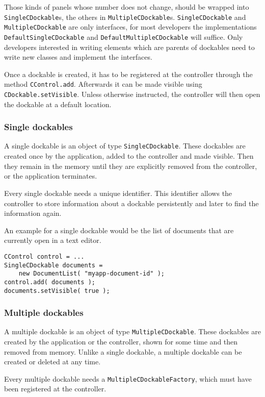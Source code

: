 \documentclass[a4paper,10pt]{article}
\newcommand{\src}[1]{\lstinline[basicstyle=\ttfamily]|#1|}
\begin{document}
Those kinds of panels whose number does not change, should be wrapped into \src{SingleCDockable}s, the others in \src{MultipleCDockable}s. \src{SingleCDockable} and \src{MultipleCDockable} are only interfaces, for most developers the implementations \src{DefaultSingleCDockable} and \src{DefaultMultipleCDockable} will suffice. Only developers interested in writing elements which are parents of dockables need to write new classes and implement the interfaces.

Once a dockable is created, it has to be registered at the controller through the method \src{CControl.add}. Afterwards it can be made visible using \src{CDockable.setVisible}. Unless otherwise instructed, the controller will then open the dockable at a default location.

\subsubsection{Single dockables}
A single dockable is an object of type \src{SingleCDockable}. These dockables are created once by the application, added to the controller and made visible. Then they remain in the memory until they are explicitly removed from the controller, or the application terminates.

Every single dockable needs a unique identifier. This identifier allows the controller to store information about a dockable persistently and later to find the information again.

An example for a single dockable would be the list of documents that are currently open in a text editor.
\begin{lstlisting}
CControl control = ...
SingleCDockable documents = 
	new DocumentList( "myapp-document-id" );
control.add( documents );
documents.setVisible( true );
\end{lstlisting}

\subsubsection{Multiple dockables}
A multiple dockable is an object of type \src{MultipleCDockable}. These dockables are created by the application or the controller, shown for some time and then removed from memory. Unlike a single dockable, a multiple dockable can be created or deleted at any time.

Every multiple dockable needs a \src{MultipleCDockableFactory}, which must have been registered at the controller.
\end{document}
